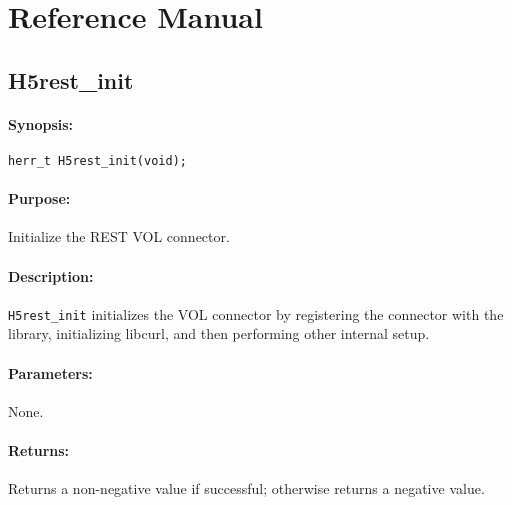 \documentclass[../users_guide.tex]{subfiles}
\begin{document}
\section{Reference Manual}
\label{apdx:ref_manual}

\subsection{H5rest\_init}
\label{ref:h5rest_init}

\paragraph{Synopsis:}
\begin{flushleft}%
\begin{verbatim}
herr_t H5rest_init(void);
\end{verbatim}
\end{flushleft}%

\paragraph{Purpose:}
\begin{flushleft}%
Initialize the REST VOL connector.
\end{flushleft}%

\paragraph{Description:}
\begin{flushleft}%
\texttt{H5rest\_init} initializes the VOL connector by registering the connector
with the library, initializing libcurl, and then performing other internal
setup.
\end{flushleft}%

\paragraph{Parameters:}
\begin{flushleft}%
None.
\end{flushleft}%

\paragraph{Returns:}
\begin{flushleft}%
Returns a non-negative value if successful; otherwise returns a negative value.
\end{flushleft}%
\end{document}

